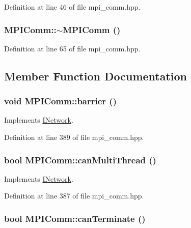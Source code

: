 Definition at line 46 of file mpi\_\-comm.hpp.\hypertarget{class_m_p_i_comm_a675ded15d2ea6e5fda6d31826c5e402f}{
\subsubsection[{$\sim$MPIComm}]{\setlength{\rightskip}{0pt plus 5cm}MPIComm::$\sim$MPIComm ()}}
\label{class_m_p_i_comm_a675ded15d2ea6e5fda6d31826c5e402f}


Definition at line 65 of file mpi\_\-comm.hpp.

\subsection{Member Function Documentation}
\hypertarget{class_m_p_i_comm_ad52e37d83780b3f42ab18c3314c9d54f}{
\subsubsection[{barrier}]{\setlength{\rightskip}{0pt plus 5cm}void MPIComm::barrier ()}}
\label{class_m_p_i_comm_ad52e37d83780b3f42ab18c3314c9d54f}


Implements \hyperlink{class_i_network_abed2c6be14fae042cc0308f3967a3bd0}{INetwork}.

Definition at line 389 of file mpi\_\-comm.hpp.\hypertarget{class_m_p_i_comm_a42d5d0b9d3a804931b2a58c468e08d0d}{
\subsubsection[{canMultiThread}]{\setlength{\rightskip}{0pt plus 5cm}bool MPIComm::canMultiThread ()}}
\label{class_m_p_i_comm_a42d5d0b9d3a804931b2a58c468e08d0d}


Implements \hyperlink{class_i_network_aad8a4fcd575712d1ef795f1133e17916}{INetwork}.

Definition at line 387 of file mpi\_\-comm.hpp.\hypertarget{class_m_p_i_comm_ae9829165ffcff61c0faea65b30e9a8c1}{
\subsubsection[{canTerminate}]{\setlength{\rightskip}{0pt plus 5cm}bool MPIComm::canTerminate ()}}
\label{class_m_p_i_comm_ae9829165ffcff61c0faea65b30e9a8c1}


